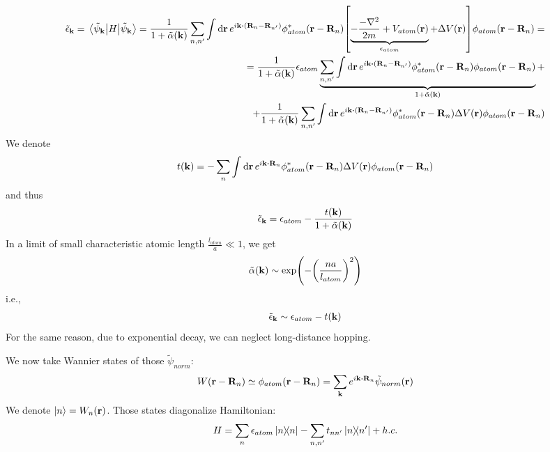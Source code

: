 
\begin{align}
\tilde{\epsilon}_{\vb{k}} = \expval{H}{\tilde{\psi}_{\vb{k}}} = \frac{1}{1+\tilde{\alpha}(\vb{k})}  \sum_{n,n'} \int \dd{\vb{r}} e^{i\vb{k} \vdot \qty(\vb{R}_n-\vb{R}_{n'})} \phi^*_{atom} (\vb{r}-\vb{R}_n) \qty[\underbrace{-\frac{-\laplacian}{2m} +V_{atom}(\vb{r})}_{\epsilon_{atom}} + \Delta V(\vb{r}) ] \phi_{atom} (\vb{r}-\vb{R}_n) =\\= \frac{1}{1+\tilde{\alpha}(\vb{k})} \epsilon_{atom} \underbrace{\sum_{n,n'} \int \dd{\vb{r}} e^{i\vb{k} \vdot \qty(\vb{R}_n-\vb{R}_{n'})} \phi^*_{atom} (\vb{r}-\vb{R}_n) \phi_{atom} (\vb{r}-\vb{R}_n)}_{1+\tilde{\alpha}(\vb{k})} +\\+ \frac{1}{1+\tilde{\alpha}(\vb{k})}  \sum_{n,n'} \int \dd{\vb{r}} e^{i\vb{k} \vdot \qty(\vb{R}_n-\vb{R}_{n'})} \phi^*_{atom} (\vb{r}-\vb{R}_n) \Delta V(\vb{r})  \phi_{atom} (\vb{r}-\vb{R}_n) 
\end{align}
We denote
\begin{align}
t(\vb{k}) = -\sum_{n} \int \dd{\vb{r}} e^{i\vb{k} \vdot \vb{R}_n} \phi^*_{atom} (\vb{r}-\vb{R}_n) \Delta V(\vb{r})  \phi_{atom} (\vb{r}-\vb{R}_n) 
\end{align}
and  thus
\begin{align}
\tilde{\epsilon}_{\vb{k}} = \epsilon_{atom}- \frac{t(\vb{k})}{1+\tilde{\alpha}(\vb{k})}  
\end{align}
In a limit of small characteristic atomic length $\frac{l_{atom}}{a} \ll 1$, we get
\begin{align}
\tilde{\alpha}(\vb{k}) \sim \exp(-\qty(\frac{na}{l_{atom}})^2)
\end{align}
i.e.,
\begin{align}
\tilde{\epsilon}_{\vb{k}} \sim \epsilon_{atom}- t(\vb{k})  
\end{align}
For the same reason, due to exponential decay, we can neglect long-distance hopping.



We now take Wannier states of those $\tilde{\psi}_{norm}$:
\begin{align}W(\vb{r} -\vb{R}_n) \simeq \phi_{atom}(\vb{r}-\vb{R}_n) = \sum_{\vb{k}} e^{i\vb{k} \vdot \vb{R}_n} \tilde{\psi}_{norm}(\vb{r})
	\end{align}
We denote $\ket{n} = W_n(\vb{r})$. Those states diagonalize Hamiltonian:
\begin{align}
H = \sum_n\epsilon_{atom}\dyad{n} - \sum_{n,n'} t_{nn'} \dyad{n}{n'} + h.c.
\end{align}

